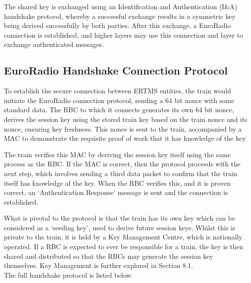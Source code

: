 \documentclass[twoside,11pt,a4paper]{article}
\begin{document}
The shared key is exchanged using an Identification and Authentication (I\&A) handshake protocol, whereby a successful exchange results in a symmetric key being derived successfully by both parties. After this exchange, a EuroRadio connection is established, and higher layers may use this connection and layer to exchange authenticated messages.
\subsection{EuroRadio Handshake Connection Protocol}
To establish the secure connection between ERTMS entities, the train would initiate the EuroRadio connection protocol, sending a 64 bit nonce with some standard data. The RBC to which it connects generates its own 64 bit nonce, derives the session key using the stored train key based on the train nonce and its nonce, ensuring key freshness. This nonce is sent to the train, accompanied by a MAC to demonstrate the requisite proof of work that it has knowledge of the key.

The train verifies this MAC by deriving the session key itself using the same process as the RBC. If the MAC is correct, then the protocol proceeds with the next step, which involves sending a third data packet to confirm that the train itself has knowledge of the key. When the RBC verifies this, and it is proven correct, an `Authentication Response' message is sent and the connection is established.

What is pivotal to the protocol is that the train has its own key which can be considered as a `seeding key', used to derive future session keys. Whilst this is private to the train, it is held by a Key Management Centre, which is nationally operated. If a RBC is expected to ever be responsible for a train, the key is then shared and distributed so that the RBCs may generate the session key themselves. Key Management is further explored in Section 8.1.\\
The full handshake protocol is listed below.
\end{document}
